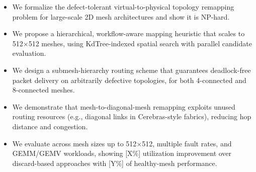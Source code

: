 \documentclass[sigconf, screen, review]{acmart}
\begin{document}


\begin{itemize}
  \item We formalize the defect-tolerant virtual-to-physical topology remapping
        problem for large-scale 2D mesh architectures and show it is NP-hard.
  \item We propose a hierarchical, workflow-aware mapping heuristic that scales to
        512$\times$512 meshes, using KdTree-indexed spatial search with parallel
        candidate evaluation.
  \item We design a submesh-hierarchy routing scheme that guarantees deadlock-free
        packet delivery on arbitrarily defective topologies, for both 4-connected
        and 8-connected meshes.
  \item We demonstrate that mesh-to-diagonal-mesh remapping exploits unused routing
        resources (e.g., diagonal links in Cerebras-style fabrics), reducing hop
        distance and congestion.
  \item We evaluate across mesh sizes up to 512$\times$512, multiple fault rates, and
        GEMM/GEMV workloads, showing [X\%] utilization improvement over discard-based
        approaches with [Y\%] of healthy-mesh performance.
\end{itemize}
\end{document}
